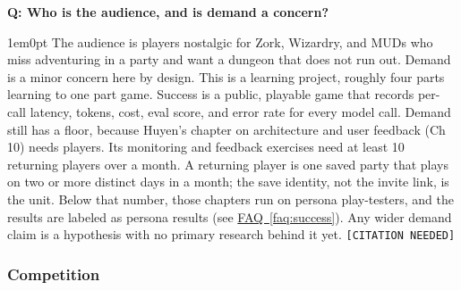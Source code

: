 \documentclass[11pt,letterpaper]{article}
\newcounter{faqnum}
\newenvironment{faqpair}[1]{%
  \needspace{4\baselineskip}\vspace{0.5em}\refstepcounter{faqnum}%
  \noindent\textbf{\color{SectionBlue}Q\thefaqnum: #1}\par\nopagebreak[4]%
  \vspace{0.2em}\begin{adjustwidth}{1em}{0pt}\setlength{\parindent}{0pt}%
}{\end{adjustwidth}\vspace{0.5em}}
\newcommand{\faqref}[1]{\hyperref[#1]{FAQ~\ref*{#1}}}
\begin{document}
\begin{faqpair}{Who is the audience, and is demand a concern?}\label{faq:audience}
The audience is players nostalgic for Zork, Wizardry, and MUDs who miss
adventuring in a party and want a dungeon that does not run out. Demand is
a minor concern here by design. This is a learning project, roughly four
parts learning to one part game. Success is a public, playable game that
records per-call latency, tokens, cost, eval score, and error rate for
every model call. Demand still has a floor, because Huyen's chapter on
architecture and user feedback (Ch 10) needs players. Its monitoring and
feedback exercises need at least 10 returning players over a month. A
returning player is one saved party that plays on two or more distinct
days in a month; the save identity, not the invite link, is the unit.
Below that number, those chapters run on
persona play-testers, and the results are labeled as persona results
(see \faqref{faq:success}). Any wider demand claim is a
hypothesis with no primary research behind it yet. \texttt{[CITATION
NEEDED]}
\end{faqpair}

\subsubsection*{Competition}
\end{document}
